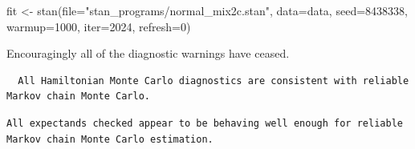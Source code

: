 \documentclass[
  letterpaper,
  DIV=11,
  numbers=noendperiod]{scrartcl}
\newenvironment{Shaded}{\begin{snugshade}}{\end{snugshade}}
\newcommand{\AttributeTok}[1]{\textcolor[rgb]{0.40,0.45,0.13}{#1}}
\newcommand{\ConstantTok}[1]{\textcolor[rgb]{0.56,0.35,0.01}{#1}}
\newcommand{\DecValTok}[1]{\textcolor[rgb]{0.68,0.00,0.00}{#1}}
\newcommand{\FunctionTok}[1]{\textcolor[rgb]{0.28,0.35,0.67}{#1}}
\newcommand{\NormalTok}[1]{\textcolor[rgb]{0.00,0.23,0.31}{#1}}
\newcommand{\OtherTok}[1]{\textcolor[rgb]{0.00,0.23,0.31}{#1}}
\newcommand{\SpecialCharTok}[1]{\textcolor[rgb]{0.37,0.37,0.37}{#1}}
\newcommand{\StringTok}[1]{\textcolor[rgb]{0.13,0.47,0.30}{#1}}
\begin{document}
\begin{Shaded}
\begin{Highlighting}[]
\NormalTok{fit }\OtherTok{\textless{}{-}} \FunctionTok{stan}\NormalTok{(}\AttributeTok{file=}\StringTok{"stan\_programs/normal\_mix2c.stan"}\NormalTok{,}
            \AttributeTok{data=}\NormalTok{data, }\AttributeTok{seed=}\DecValTok{8438338}\NormalTok{,}
            \AttributeTok{warmup=}\DecValTok{1000}\NormalTok{, }\AttributeTok{iter=}\DecValTok{2024}\NormalTok{, }\AttributeTok{refresh=}\DecValTok{0}\NormalTok{)}
\end{Highlighting}
\end{Shaded}

Encouragingly all of the diagnostic warnings have ceased.

\begin{Shaded}
\end{Shaded}

\begin{verbatim}
  All Hamiltonian Monte Carlo diagnostics are consistent with reliable
Markov chain Monte Carlo.
\end{verbatim}

\begin{Shaded}
\end{Shaded}

\begin{verbatim}
All expectands checked appear to be behaving well enough for reliable
Markov chain Monte Carlo estimation.
\end{verbatim}
\end{document}
